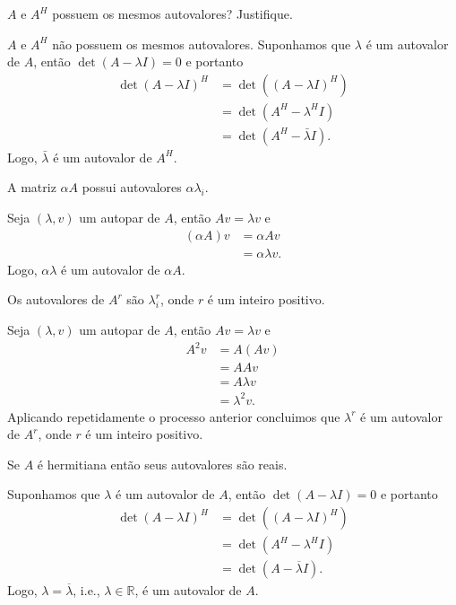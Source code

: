 \begin{questions}
    \question $A$ e $A^H$ possuem os mesmos autovalores? Justifique.
    \begin{solution}
        $A$ e $A^H$ n\~{a}o possuem os mesmos autovalores. Suponhamos que $\lambda$ \'{e} um autovalor de $A$, ent\~{a}o $\det(A - \lambda I) = 0$ e portanto
        \begin{align*}
            \det(A - \lambda I)^H &= \det\left( (A - \lambda I)^H \right) \\
            &= \det(A^H - \lambda^H I) \\
            &= \det(A^H - \bar{\lambda} I).
        \end{align*}
        Logo, $\bar{\lambda}$ \'{e} um autovalor de $A^H$.
    \end{solution}

    \question A matriz $\alpha A$ possui autovalores $\alpha \lambda_i$.
    \begin{solution}
        Seja $(\lambda, v)$ um autopar de $A$, ent\~{a}o $A v = \lambda v$ e
        \begin{align*}
            (\alpha A) v &= \alpha A v \\
            &= \alpha \lambda v.
        \end{align*}
        Logo, $\alpha \lambda$ \'{e} um autovalor de $\alpha A$.
    \end{solution}

    \question Os autovalores de $A^r$ s\~{a}o $\lambda_i^r$, onde $r$ \'{e} um inteiro positivo.
    \begin{solution}
        Seja $(\lambda, v)$ um autopar de $A$, ent\~{a}o $A v = \lambda v$ e
        \begin{align*}
            A^2 v &= A (A v) \\
            &= A A v \\
            &= A \lambda v \\
            &= \lambda^2 v.
        \end{align*}
        Aplicando repetidamente o processo anterior concluimos que $\lambda^r$ \'{e} um autovalor de $A^r$, onde $r$ \'{e} um inteiro positivo.
    \end{solution}

    \question Se $A$ \'{e} hermitiana ent\~{a}o seus autovalores s\~{a}o reais.
    \begin{solution}
        Suponhamos que $\lambda$ \'{e} um autovalor de $A$, ent\~{a}o $\det(A - \lambda I) = 0$ e portanto
        \begin{align*}
            \det(A - \lambda I)^H &= \det\left( (A - \lambda I)^H \right) \\
            &= \det(A^H - \lambda^H I) \\
            &= \det(A - \overline{\lambda} I).
        \end{align*}
        Logo, $\lambda = \overline{\lambda}$, i.e., $\lambda \in \mathbb{R}$, \'{e} um autovalor de $A$.
    \end{solution}


\end{questions}
